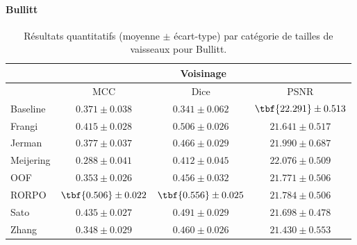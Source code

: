 \paragraph{Bullitt}

\begin{table}[!ht]
  \begin{center}
  \label{tab:Vessels size Bullitt}
  \caption{Résultats quantitatifs (moyenne $\pm$ écart-type) par catégorie de tailles de vaisseaux pour Bullitt.}
  
  \begin{tabular}{lccc}
            \hline
            & \multicolumn{3}{c}{Voisinage}                  \\
            \hline
            & MCC & Dice & PSNR  \\
            Baseline	    & $ 0.371 \pm 0.038 $ & $ 0.341 \pm 0.062 $ & $ \tbf{22.291} \pm	0.513 $ \\
            Frangi	      & $ 0.415 \pm 0.028 $ & $ 0.506 \pm 0.026 $ & $ 21.641 \pm	0.517 $ \\
            Jerman	      & $ 0.377 \pm 0.037 $ & $ 0.466 \pm 0.029 $ & $ 21.990 \pm	0.687 $ \\
            Meijering	    & $ 0.288 \pm 0.041 $ & $ 0.412 \pm 0.045 $ & $ 22.076 \pm	0.509 $ \\ 
            OOF	          & $ 0.353 \pm 0.026 $ & $ 0.456 \pm 0.032 $ & $ 21.771 \pm	0.506 $ \\
            RORPO	        & $ \tbf{0.506} \pm 0.022 $ & $ \tbf{0.556} \pm 0.025 $ & $ 21.784 \pm	0.506 $ \\
            Sato	        & $ 0.435 \pm 0.027 $ & $ 0.491 \pm 0.029 $ & $ 21.698 \pm	0.478 $ \\
            Zhang	        & $ 0.348 \pm 0.029 $ & $ 0.460 \pm 0.026 $ & $ 21.430 \pm	0.553 $ \\
      

\end{tabular}
\end{center}
\end{table}
